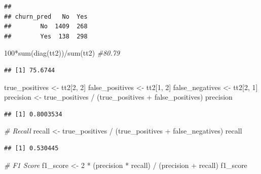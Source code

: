 \documentclass[
  twoside]{article}
\newenvironment{Shaded}{\begin{snugshade}}{\end{snugshade}}
\newcommand{\CommentTok}[1]{\textcolor[rgb]{0.56,0.35,0.01}{\textit{#1}}}
\newcommand{\DecValTok}[1]{\textcolor[rgb]{0.00,0.00,0.81}{#1}}
\newcommand{\FunctionTok}[1]{\textcolor[rgb]{0.00,0.00,0.00}{#1}}
\newcommand{\NormalTok}[1]{#1}
\newcommand{\OtherTok}[1]{\textcolor[rgb]{0.56,0.35,0.01}{#1}}
\newcommand{\SpecialCharTok}[1]{\textcolor[rgb]{0.00,0.00,0.00}{#1}}
\begin{document}
\begin{verbatim}
##           
## churn_pred   No  Yes
##        No  1409  268
##        Yes  138  298
\end{verbatim}

\begin{Shaded}
\begin{Highlighting}[]
\DecValTok{100}\SpecialCharTok{*}\FunctionTok{sum}\NormalTok{(}\FunctionTok{diag}\NormalTok{(tt2))}\SpecialCharTok{/}\FunctionTok{sum}\NormalTok{(tt2) }\CommentTok{\#80.79}
\end{Highlighting}
\end{Shaded}

\begin{verbatim}
## [1] 75.6744
\end{verbatim}

\begin{Shaded}
\begin{Highlighting}[]
\NormalTok{true\_positives }\OtherTok{\textless{}{-}}\NormalTok{ tt2[}\DecValTok{2}\NormalTok{, }\DecValTok{2}\NormalTok{]}
\NormalTok{false\_positives }\OtherTok{\textless{}{-}}\NormalTok{ tt2[}\DecValTok{1}\NormalTok{, }\DecValTok{2}\NormalTok{]}
\NormalTok{false\_negatives }\OtherTok{\textless{}{-}}\NormalTok{ tt2[}\DecValTok{2}\NormalTok{, }\DecValTok{1}\NormalTok{]}
\NormalTok{precision }\OtherTok{\textless{}{-}}\NormalTok{ true\_positives }\SpecialCharTok{/}\NormalTok{ (true\_positives }\SpecialCharTok{+}\NormalTok{ false\_positives)}
\NormalTok{precision}
\end{Highlighting}
\end{Shaded}

\begin{verbatim}
## [1] 0.8003534
\end{verbatim}

\begin{Shaded}
\begin{Highlighting}[]
\CommentTok{\# Recall}
\NormalTok{recall }\OtherTok{\textless{}{-}}\NormalTok{ true\_positives }\SpecialCharTok{/}\NormalTok{ (true\_positives }\SpecialCharTok{+}\NormalTok{ false\_negatives)}
\NormalTok{recall}
\end{Highlighting}
\end{Shaded}

\begin{verbatim}
## [1] 0.530445
\end{verbatim}

\begin{Shaded}
\begin{Highlighting}[]
\CommentTok{\# F1 Score}
\NormalTok{f1\_score }\OtherTok{\textless{}{-}} \DecValTok{2} \SpecialCharTok{*}\NormalTok{ (precision }\SpecialCharTok{*}\NormalTok{ recall) }\SpecialCharTok{/}\NormalTok{ (precision }\SpecialCharTok{+}\NormalTok{ recall)}
\NormalTok{f1\_score}
\end{Highlighting}
\end{Shaded}
\end{document}
